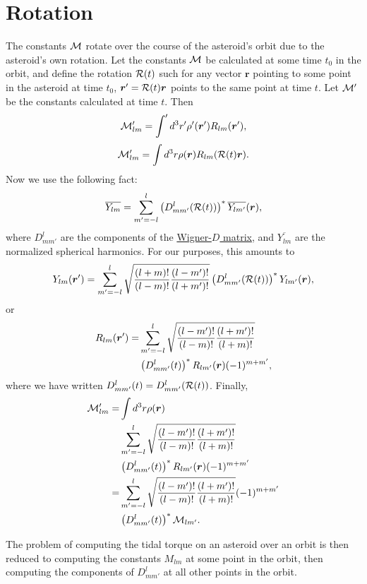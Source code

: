 \documentclass[aps,twocolumn,secnumarabic,balancelastpage,amsmath,amssymb,nofootinbib,floatfix]{revtex4-1}
\begin{document}
\section{Rotation}
The constants $\mathcal{M}$ rotate over the course of the asteroid's orbit due to the asteroid's own rotation. Let the constants $\mathcal{M}$ be calculated at some time $t_0$ in the orbit, and define the rotation $\mathcal{R}(t)$ such for any vector $\bm r$ pointing to some point in the asteroid at time $t_0$, $\bm r' = \mathcal{R}(t) \bm r$ points to the same point at time $t$. Let $\mathcal{M}'$ be the constants calculated at time $t$. Then
$$\mathcal{M}'_{lm} = \int' d^3 r' \rho'(\bm r') R_{lm}(\bm r'),$$
$$\mathcal{M}'_{lm} = \int d^3 r \rho(\bm r) R_{lm}(\mathcal{R}(t)\bm r).$$
Now we use the following fact:
$$\overline{Y_{lm}} = \sum_{m'=-l}^l\left( D^l_{mm'}(\mathcal{R}(t)) \right)^*\overline{Y_{lm'}}(\bm r),$$
where $D^l_{mm'}$ are the components of the \href{https://en.wikipedia.org/wiki/Wigner_D-matrix#Relation_to_spherical_harmonics_and_Legendre_polynomials}{Wigner-$D$ matrix}, and $\overline{Y_{lm}}$ are the normalized spherical harmonics. For our purposes, this amounts to
$$Y_{lm}(\bm r') = \sum_{m'=-l}^l\sqrt{\frac{(l+m)!}{(l-m)!}\frac{(l-m')!}{(l+m')!}}\left( D^l_{mm'}(\mathcal{R}(t)) \right)^*Y_{lm'}(\bm r),$$
or
\begin{equation*}
\begin{aligned}
R_{lm}(\bm r') = &\sum_{m'=-l}^l\sqrt{\frac{(l-m')!}{(l-m)!}\frac{(l+m')!}{(l+m)!}}\\
&\left( D^l_{mm'}(t) \right)^*R_{lm'}(\bm r)(-1)^{m+m'},
\end{aligned}
\end{equation*}
where we have written $D^l_{mm'}(t)=D^l_{mm'}(\mathcal{R}(t))$. Finally,
\begin{equation*}
\begin{aligned}
\mathcal{M}'_{lm} =& \int d^3 r \rho(\bm r) \\
&\sum_{m'=-l}^l\sqrt{\frac{(l-m')!}{(l-m)!}\frac{(l+m')!}{(l+m)!}}\\
&\left( D^l_{mm'}(t) \right)^*R_{lm'}(\bm r)(-1)^{m+m'}\\
=&\sum_{m'=-l}^l\sqrt{\frac{(l-m')!}{(l-m)!}\frac{(l+m')!}{(l+m)!}}(-1)^{m+m'}\\
&\left( D^l_{mm'}(t) \right)^*\mathcal{M}_{lm'}.
\end{aligned}
\end{equation*}

The problem of computing the tidal torque on an asteroid over an orbit is then reduced to computing the constants $M_{lm}$ at some point in the orbit, then computing the components of $D^l_{mm'}$ at all other points in the orbit.
\end{document}
